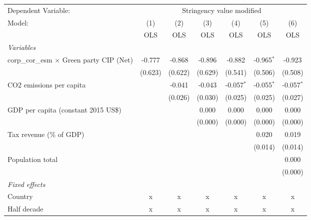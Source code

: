
\begingroup
\centering
\begin{tabular}{lcccccc}
   \toprule
   Dependent Variable: & \multicolumn{6}{c}{Stringency value modified}\\
   Model:                                           & (1)     & (2)     & (3)     & (4)          & (5)          & (6)\\  
                                                    &  OLS    & OLS     & OLS     & OLS          & OLS          & OLS\\  
   \midrule
   \emph{Variables}\\
   corp\_cor\_esm $\times$ Green party CIP (Net)    & -0.777  & -0.868  & -0.896  & -0.882       & -0.965$^{*}$ & -0.923\\   
                                                    & (0.623) & (0.622) & (0.629) & (0.541)      & (0.506)      & (0.508)\\   
   CO2 emissions per capita                         &         & -0.041  & -0.043  & -0.057$^{*}$ & -0.055$^{*}$ & -0.057$^{*}$\\   
                                                    &         & (0.026) & (0.030) & (0.025)      & (0.025)      & (0.027)\\   
   GDP per capita (constant 2015 US\$)              &         &         & 0.000   & 0.000        & 0.000        & 0.000\\   
                                                    &         &         & (0.000) & (0.000)      & (0.000)      & (0.000)\\   
   Tax revenue (\% of GDP)                          &         &         &         &              & 0.020        & 0.019\\   
                                                    &         &         &         &              & (0.014)      & (0.014)\\   
   Population total                                 &         &         &         &              &              & 0.000\\   
                                                    &         &         &         &              &              & (0.000)\\   
   \emph{Fixed effects}\\
   Country                                          & x       & x       & x       & x            & x            & x\\  
   Half decade                                      & x       & x       & x       & x            & x            & x\\  

\end{tabular}

